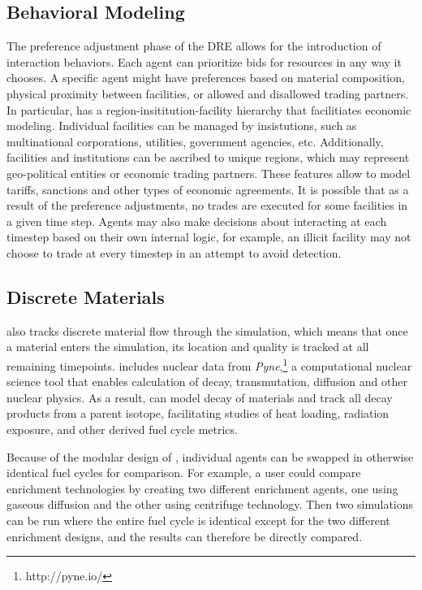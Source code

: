 \subsection{Behavioral Modeling}
The preference adjustment phase of the \gls{DRE} allows for the introduction of interaction behaviors.  Each agent can prioritize bids for resources in any way it chooses. A specific agent might have preferences based on material composition, physical proximity between facilities, or allowed and disallowed trading partners. In particular, \Cyclus has a region-insititution-facility hierarchy that facilitiates economic modeling\cite{oliver_geniusv2:_2009}.  Individual facilities can be managed by insistutions, such as multinational corporations, utilities, government agencies, etc.  Additionally, facilities and institutions can be ascribed to unique regions, which may represent geo-political entities or economic trading partners. These features allow \Cyclus to model tariffs, sanctions and other types of economic agreements.  It is possible that as a result of the preference adjustments, no trades are executed for some facilities in a given time step.  Agents may also make decisions about interacting at each timestep based on their own internal logic, for example, an illicit facility may not choose to trade at every timestep in an attempt to avoid detection. 

\subsection{Discrete Materials}
\Cyclus also tracks discrete material flow through the simulation, which means that once a material enters the simulation, its location and quality is tracked at all remaining timepoints\cite{huff_integrated:_2013}.  \Cyclus includes nuclear data from \emph{Pyne},\footnote{http://pyne.io/} a computational nuclear science tool that enables calculation of decay, transmutation, diffusion and other nuclear physics\cite{Scopatz2012b}. As a result, \Cyclus can  model decay of materials and track all decay products from a parent isotope, facilitating studies of heat loading, radiation exposure, and other derived fuel cycle metrics\cite{scopatz_cymetric_2015}.

Because of the modular design of \Cyclus, individual agents can be swapped in otherwise identical fuel cycles for comparison. For example, a user could compare enrichment technologies by creating two different enrichment agents, one using gaseous diffusion and the other using centrifuge technology. Then two simulations can be run where the entire fuel cycle is identical except for the two different enrichment designs, and the results can therefore be directly compared.
